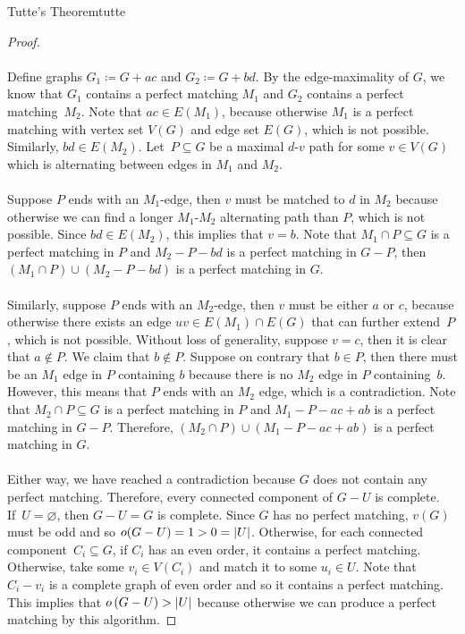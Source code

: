 \documentclass[math]{amznotes}
\theoremstyle{remark}
\begin{document}
\begin{thmbox}{Tutte's Theorem}{tutte}
\begin{proof}
        \\\\
        Define graphs $G_1 \coloneqq G + ac$ and $G_2 \coloneqq G + bd$. By the edge-maximality of $G$, we know that $G_1$ contains a perfect matching $M_1$ and $G_2$ contains a perfect matching~$M_2$. Note that $ac \in E(M_1)$, because otherwise $M_1$ is a perfect matching with vertex set $V(G)$ and edge set $E(G)$, which is not possible. Similarly, $bd \in E(M_2)$. Let~$P \subseteq G$ be a maximal $d$-$v$ path for some $v \in V(G)$ which is alternating between edges in $M_1$ and $M_2$.
        \\\\
        Suppose $P$ ends with an $M_1$-edge, then $v$ must be matched to $d$ in $M_2$ because otherwise we can find a longer $M_1$-$M_2$ alternating path than $P$, which is not possible. Since $bd \in E(M_2)$, this implies that $v = b$. Note that $M_1 \cap P \subseteq G$ is a perfect matching in $P$ and $M_2 - P - bd$ is a perfect matching in $G - P$, then $(M_1 \cap P) \cup (M_2 - P - bd)$ is a perfect matching in $G$.
        \\\\
        Similarly, suppose $P$ ends with an $M_2$-edge, then $v$ must be either $a$ or $c$, because otherwise there exists an edge $uv \in E(M_1) \cap E(G)$ that can further extend~$P$, which is not possible. Without loss of generality, suppose $v = c$, then it is clear that $a \notin P$. We claim that $b \notin P$. Suppose on contrary that $b \in P$, then there must be an $M_1$ edge in $P$ containing $b$ because there is no $M_2$ edge in $P$ containing~$b$. However, this means that $P$ ends with an $M_2$ edge, which is a contradiction. Note that $M_2 \cap P \subseteq G$ is a perfect matching in $P$ and $M_1 - P - ac + ab$ is a perfect matching in $G - P$. Therefore, $(M_2 \cap P) \cup (M_1 - P - ac + ab)$ is a perfect matching in $G$.
        \\\\
        Either way, we have reached a contradiction because $G$ does not contain any perfect matching. Therefore, every connected component of $G - U$ is complete. If~$U = \varnothing$, then $G - U = G$ is complete. Since $G$ has no perfect matching, $v(G)$ must be odd and so $o(G - U) = 1 > 0 = {\left\lvert {U} \right\rvert}$. Otherwise, for each connected component~$C_i \subseteq G$, if $C_i$ has an even order, it contains a perfect matching. Otherwise, take some $v_i \in V(C_i)$ and match it to some $u_i \in U$. Note that $C_i - v_i$ is a complete graph of even order and so it contains a perfect matching. This implies that $o\left(G - U\right) > {\left\lvert {U} \right\rvert}$ because otherwise we can produce a perfect matching by this algorithm.
    \end{proof}
\end{thmbox}
\end{document}
